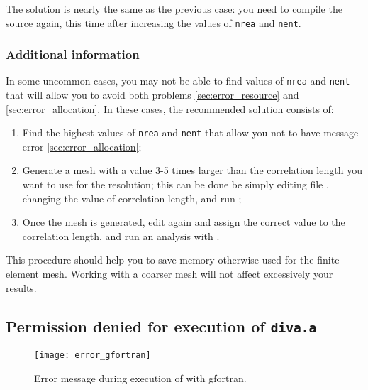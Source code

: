 \subsubsection{\answer}

The solution is nearly the same as the previous case: you need to compile the source again, this time after increasing the values of \texttt{nrea} and \texttt{nent}.

\subsubsection[Additional information]{Additional information \expert}

In some uncommon cases, you may not be able to find values of \texttt{nrea} and \texttt{nent} that will allow you to avoid both problems \ref{sec:error_resource} and \ref{sec:error_allocation}. In these cases, the recommended solution consists of:
\begin{enumerate}
\item Find the highest values of \texttt{nrea} and \texttt{nent} that allow you not to have message error \ref{sec:error_allocation};
\item Generate a mesh with a value 3-5 times larger than the correlation length you want to use for the resolution; this can be done be simply editing file , changing the value of correlation length, and run ;
\item Once the mesh is generated, edit again  and assign the correct value to the correlation length, and run an analysis with .
\end{enumerate}

This procedure should help you to save memory otherwise used for the finite-element mesh. Working with a coarser mesh will not affect excessively your results.


\subsection{Permission denied for execution of \texttt{diva.a}\label{sec:error_gfortran}}


\begin{figure}[htpb]
\centering
\texttt{[image: error\_gfortran]}
\caption{Error message during execution of  with gfortran\label{fig:error_gfortran}.}
\end{figure}

